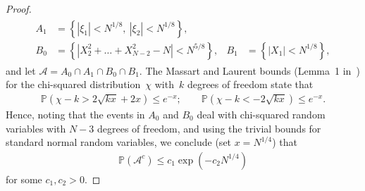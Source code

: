 \documentclass[12pt]{article}
\newcommand{\1}{\mathbf{1}}
\begin{document}
\begin{proof}
\begin{align*}
\begin{array}{clrl}
A_1&=\left\{|\xi_1|<N^{1/8},\ |\xi_2|<N^{1/8}\right\}, 
\\
B_0&=\left\{|X_2^2+\dots+X_{N-2}^2-N| <N^{5/8}\right\}, &B_1&=\left\{|X_1|<N^{1/8}\right\},
\end{array}
\end{align*}
and let $\mathcal{A}=A_0\cap A_1\cap B_0\cap B_1$. 
The  Massart and Laurent bounds (Lemma~1 in~\cite{LM}) for the chi-squared distribution~$\chi$ with~$k$ degrees of freedom state that
\begin{align*}
\mathbb{P}\left(\chi-k>2\sqrt{kx}+2x\right)\le e^{-x};\qquad
\mathbb{P}\left(\chi-k<-2\sqrt{kx}\right)\le  e^{-x}.
\end{align*}
Hence, noting that the events in $A_0$ and $B_0$ deal with chi-squared random variables with $N-3$ degrees of freedom, and using the trivial bounds for standard normal random variables, we conclude (set $x=N^{1/4}$) that
\begin{align}
\label{eq:Acal}
\mathbb{P}(\mathcal{A}^c)\le c_1 \exp\left(-c_2 N^{1/4}\right)   
\end{align}
for some $c_1,c_2>0$.


\end{proof}
\end{document}
